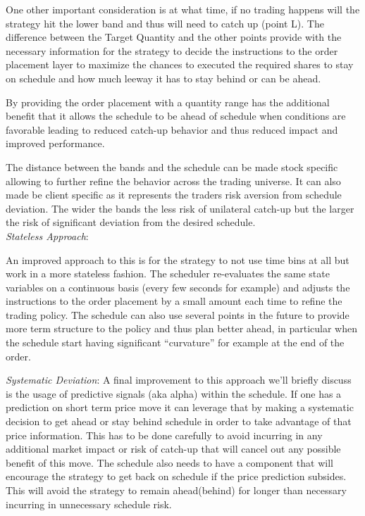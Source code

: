 One other important consideration is at what time, if no trading happens will the strategy hit the lower band and thus will need to catch up (point L). The difference between the Target Quantity and the other points provide with the necessary  information for the strategy to decide the instructions to the order placement layer to maximize the chances to executed the required shares to stay on schedule and how much leeway it has to stay behind or can be ahead.

By providing the order placement with a quantity range has the additional benefit that it allows the schedule to be ahead of schedule when conditions are favorable leading to reduced catch-up behavior and thus reduced impact and improved performance.

The distance between the bands and the schedule can be made stock specific allowing to further refine the behavior across the trading universe.  It can also made be client specific as it represents the traders risk aversion from schedule deviation. The wider the bands the less risk of unilateral catch-up but the larger the risk of significant deviation from the desired schedule.\\

\noindent\emph{Stateless Approach}: 

An improved approach to this is for the strategy to not use time bins at all but work in a more stateless fashion. The scheduler re-evaluates the same state variables on a continuous basis (every few seconds for example) and adjusts the instructions to the order placement by a small amount each time to refine the trading policy. The schedule can also use several points in the future to provide more term structure to the policy and thus plan better ahead, in particular when the schedule start having significant ``curvature'' for example at the end of the order.

\noindent\emph{Systematic Deviation}:
A final improvement to this approach we'll briefly discuss is the usage of predictive signals (aka alpha) within the schedule. If one has a prediction on short term price move it can leverage that by making a systematic decision to get ahead or stay behind schedule in order to take advantage of that price information. This has to be done carefully to avoid incurring in any additional market impact or risk of catch-up that will cancel out any possible benefit of this move. The schedule also needs to have a component that will encourage the strategy to get back on schedule if the price prediction subsides. This will avoid the strategy to remain ahead(behind) for longer than necessary incurring in unnecessary schedule risk.

